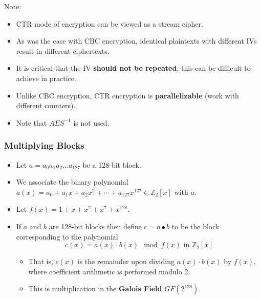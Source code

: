 \documentclass[12pt,titlepage]{article}
\begin{document}
Note: \begin{itemize}
	\item CTR mode of encryption can be viewed as a stream cipher.
	\item As was the case with CBC encryption, identical plaintexts with different IVs result in different ciphertexts.
	\item It is critical that the IV \textbf{should not be repeated}; this can be difficult to achieve in practice.
	\item Unlike CBC encryption, CTR encryption is \textbf{parallelizable} (work with different counters).
	\item Note that $AES^{-1}$ is not used.
\end{itemize}

\subsubsection{Multiplying Blocks}
\begin{itemize}
	\item Let $a = a_0 a_1 a_2 ... a_{127}$ be a $128$-bit block.
	\item We associate the binary polynomial $a(x) = a_0 + a_1 x + a_2 x^2 + \cdots + a_{127} x^{127} \in \mathbb{Z}_2[x]$ with $a$.
	\item Let $f(x) = 1 + x + x^2 + x^7 + x^{128}$.
	\item If $a$ and $b$ are 128-bit blocks then define $c = a \bullet b$ to be the block corresponding to the polynomial $$c(x) = a(x) \cdot b(x) \mod f(x) \text{ in } \mathbb{Z}_2[x]$$\begin{itemize}
		\item That is, $c(x)$ is the remainder upon dividing $a(x) \cdot b(x)$ by $f(x)$, where coefficient arithmetic is performed modulo 2.
		\item This is multiplication in the \textbf{Galois Field} $GF(2^{128})$.
	\end{itemize}
\end{itemize}
\end{document}
